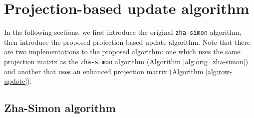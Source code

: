 \section{Projection-based update algorithm}
\label{sec:alg}

In the following sections, we first introduce the original \verb|zha-simon| algorithm, then introduce the proposed projection-based update algorithm.
Note that there are two implementations to the proposed algorithm: one which uses the same projection matrix as the \verb|zha-simon| algorithm (Algorithm \ref{alg:orig_zha-simon}) and another that uses an enhanced projection matrix (Algorithm \ref{alg:row-update}).

\subsection{Zha-Simon algorithm}
\label{alg:zha-simon}

